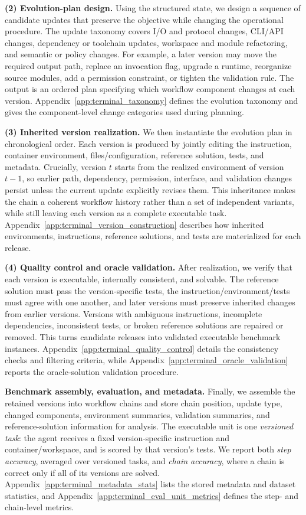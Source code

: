 \documentclass{llmxive}
\begin{document}
\textbf{(2) Evolution-plan design.} \noindent
Using the structured state, we design a sequence of candidate updates that preserve the objective while changing the operational procedure. The update taxonomy covers I/O and protocol changes, CLI/API changes, dependency or toolchain updates, workspace and module refactoring, and semantic or policy changes. For example, a later version may move the required output path, replace an invocation flag, upgrade a runtime, reorganize source modules, add a permission constraint, or tighten the validation rule. The output is an ordered plan specifying which workflow component changes at each version. Appendix~\ref{app:terminal_taxonomy} defines the evolution taxonomy and gives the component-level change categories used during planning.

\textbf{(3) Inherited version realization.} \noindent
We then instantiate the evolution plan in chronological order. Each version is produced by jointly editing the instruction, container environment, files/configuration, reference solution, tests, and metadata. Crucially, version $t$ starts from the realized environment of version $t-1$, so earlier path, dependency, permission, interface, and validation changes persist unless the current update explicitly revises them. This inheritance makes the chain a coherent workflow history rather than a set of independent variants, while still leaving each version as a complete executable task. Appendix~\ref{app:terminal_version_construction} describes how inherited environments, instructions, reference solutions, and tests are materialized for each release.

\textbf{(4) Quality control and oracle validation.} \noindent
After realization, we verify that each version is executable, internally consistent, and solvable. The reference solution must pass the version-specific tests, the instruction/environment/tests must agree with one another, and later versions must preserve inherited changes from earlier versions. Versions with ambiguous instructions, incomplete dependencies, inconsistent tests, or broken reference solutions are repaired or removed. This turns candidate releases into validated executable benchmark instances. Appendix~\ref{app:terminal_quality_control} details the consistency checks and filtering criteria, while Appendix~\ref{app:terminal_oracle_validation} reports the oracle-solution validation procedure.

\textbf{Benchmark assembly, evaluation, and metadata.} \noindent
Finally, we assemble the retained versions into workflow chains and store chain position, update type, changed components, environment summaries, validation summaries, and reference-solution information for analysis. The executable unit is one \emph{versioned task}: the agent receives a fixed version-specific instruction and container/workspace, and is scored by that version's tests. We report both \emph{step accuracy}, averaged over versioned tasks, and \emph{chain accuracy}, where a chain is correct only if all of its versions are solved. Appendix~\ref{app:terminal_metadata_stats} lists the stored metadata and dataset statistics, and Appendix~\ref{app:terminal_eval_unit_metrics} defines the step- and chain-level metrics.
\end{document}
